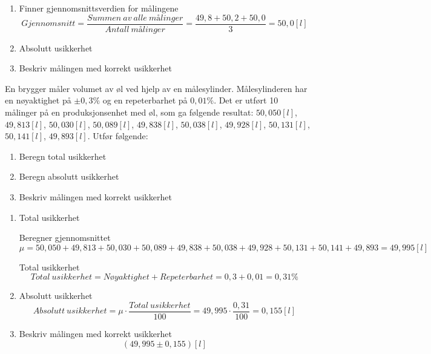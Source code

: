 \vspace{0.5cm} %

\begin{solution}[name=Løsningsforslag oppgave]
	\begin{enumerate}[label=\roman*)]
		\item Finner gjennomsnittsverdien for målingene
\[Gjennomsnitt= \frac{Summen\ av\ alle\ m\text{å}linger}{Antall\ m\text{å}linger}= \frac{49,8+50,2+50,0}{3}=50,0[l]\]

		\item Absolutt usikkerhet

		\item Beskriv målingen med korrekt usikkerhet

	\end{enumerate}
\end{solution}




\begin{question}[name=Oppgave, topic=måleusikkerhet]
En brygger måler volumet av øl ved hjelp av en målesylinder. Målesylinderen har en nøyaktighet på $\pm 0,3 \%$ og en repeterbarhet på $0,01 \%$. Det er utført 10 målinger på en produksjonsenhet med øl, som ga følgende resultat: $50,050[l]$, $49,813[l]$, $50,030[l]$, $50,089[l]$, $49,838[l]$, $50,038[l]$, $49,928[l]$, $50,131[l]$, $50,141[l]$, $49,893[l]$. Utfør følgende:

\begin{enumerate}[label=\roman*)]
	\item Beregn total usikkerhet
	\item Beregn absolutt usikkerhet
	\item Beskriv målingen med korrekt usikkerhet
\end{enumerate}

\end{question}

\vspace{0.5cm} %

\begin{solution}[name=Løsningsforslag oppgave]
	\begin{enumerate}[label=\roman*)]
	\item Total usikkerhet

		Beregner gjennomsnittet
		\[\mu = 50,050 + 49,813 + 50,030 + 50,089 + 49,838 + 50,038 + 49,928 + 50,131 + 50,141 + 49,893 = 49,995[l]\]

		Total usikkerhet
		\[Total\ usikkerhet = Nøyaktighet + Repeterbarhet = 0,3 + 0,01 = 0,31 \%\]
	\item Absolutt usikkerhet
		\[Absolutt\ usikkerhet = \mu \cdot \frac{Total\ usikkerhet}{100}= 49,995 \cdot \frac{0,31}{100}=0,155 [l]\]

	\item Beskriv målingen med korrekt usikkerhet
		\[(49,995 \pm 0,155) [l]\]

	\end{enumerate}
\end{solution}



